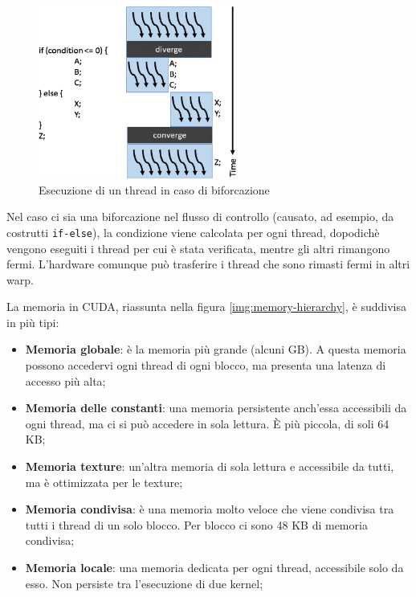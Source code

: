 \documentclass[12pt,a4paper,openright,twoside]{report}
\begin{document}
\begin{figure}[h]
\centering{}
\includegraphics[width=6.5cm]{warp-branch.png}
\caption{Esecuzione di un thread in caso di biforcazione}
\label{img:warp-branch}
\end{figure}

Nel caso ci sia una biforcazione nel flusso di controllo (causato, ad esempio, da costrutti \verb|if-else|), la condizione viene calcolata per ogni thread, dopodichè vengono eseguiti i thread per cui è stata verificata, mentre gli altri rimangono fermi. L'hardware comunque può trasferire i thread che sono rimasti fermi in altri warp.

\newpage

La memoria in CUDA, riassunta nella figura \ref{img:memory-hierarchy}, è suddivisa in più tipi:

\begin{itemize}
    \item \textbf{Memoria globale}: è la memoria più grande (alcuni GB). A questa memoria possono accedervi ogni thread di ogni blocco, ma presenta una latenza di accesso più alta;
    \item \textbf{Memoria delle constanti}: una memoria persistente anch'essa accessibili da ogni thread, ma ci si può accedere in sola lettura. È più piccola, di soli 64 KB;
    \item \textbf{Memoria texture}: un'altra memoria di sola lettura e accessibile da tutti, ma è ottimizzata per le texture;
    \item \textbf{Memoria condivisa}: è una memoria molto veloce che viene condivisa tra tutti i thread di un solo blocco. Per blocco ci sono 48 KB di memoria condivisa;
    \item \textbf{Memoria locale}: una memoria dedicata per ogni thread, accessibile solo da esso. Non persiste tra l'esecuzione di due kernel;
\end{itemize}
\end{document}
